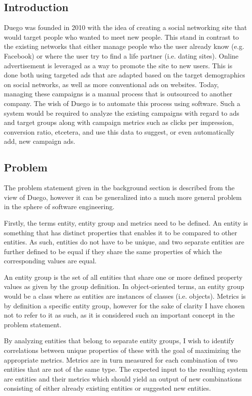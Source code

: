 \documentclass[a4paper]{article}
\begin{document}
\subsection{Introduction}
Duego was founded in 2010 with the idea of creating a social networking site that would target people who wanted to meet new 
people. This stand in contrast to the existing networks that either manage people who the user already know (e.g. Facebook) 
or where the user try to find a life partner (i.e. dating sites). Online advertisement is leveraged as a way to promote the 
site to new users. This is done both using targeted ads that are adapted based on the target demographics on social networks, 
as well as more conventional ads on websites. Today, managing these campaigns is a manual process that is outsourced to 
another company. The wish of Duego is to automate this process using software. Such a system would be required to analyze 
the existing campaigns with regard to ads and target groups along with campaign metrics such as clicks per impression, 
conversion ratio, etcetera, and use this data to suggest, or even automatically add, new campaign ads.

\subsection{Problem}
The problem statement given in the background section is described from the view of Duego, however it can be generalized into 
a much more general problem in the sphere of software engineering.

Firstly, the terms entity, entity group and metrics need to be defined. An entity is something that has distinct properties 
that enables it to be compared to other entities. As such, entities do not have to be unique, and two separate entities are 
further defined to be equal if they share the same properties of which the corresponding values are equal.

An entity group is the set of all entities that share one or more defined property values as given by the group definition. 
In object-oriented terms, an entity group would be a class where as entities are instances of classes (i.e. objects). Metrics 
is by definition a specific entity group, however for the sake of clarity I have chosen not to refer to it as such, as it is 
considered such an important concept in the problem statement.

By analyzing entities that belong to separate entity groups, I wish to identify correlations between unique properties of 
these with the goal of maximizing the appropriate metrics. Metrics are in turn measured for each combination of two entities 
that are not of the same type. The expected input to the resulting system are entities and their metrics which should yield 
an output of new combinations consisting of either already existing entities or suggested new entities.
\end{document}
